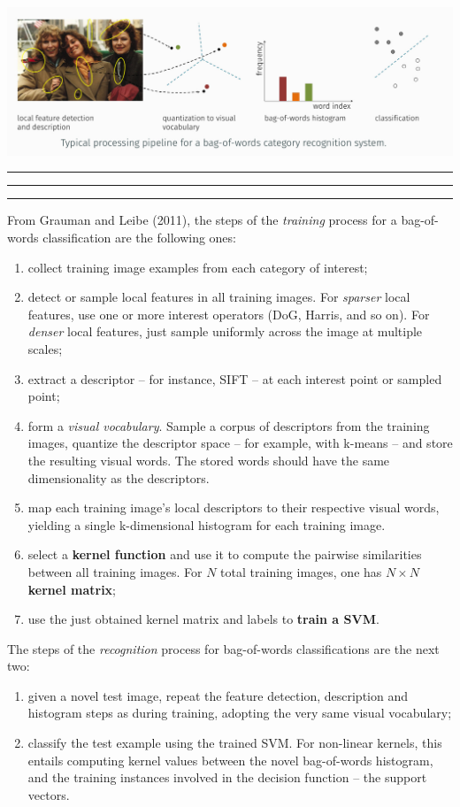 \documentclass[10pt]{report}
\begin{document}
\begin{center}
\includegraphics[width=.9\linewidth]{./pics/recog/bag-of-words-pipeline.jpg}
\end{center}

\vspace*{0.6cm}\hrule
\hrule
\hrule
\vspace*{0.4cm}
From Grauman and Leibe (2011), the steps of the \emph{training} process for a bag\--of\--words classification are the following ones:

\begin{enumerate}
\item collect training image examples from each category of interest;
\item detect or sample local features in all training images. For \emph{sparser} local features, use one or more interest operators (DoG, Harris, and so on). For \emph{denser} local features, just sample uniformly across the image at multiple scales;
\item extract a descriptor -- for instance, SIFT -- at each interest point or sampled point;
\item form a \emph{visual vocabulary}. Sample a corpus of descriptors from the training images, quantize the descriptor space -- for example, with k\--means -- and store the resulting visual words. The stored words should have the same dimensionality as the descriptors.
\item map each training image's local descriptors to their respective visual words, yielding a single k\--dimensional histogram for each training image.
\item select a \textbf{kernel function} and use it to compute the pairwise similarities between all training images. For \(N\) total training images, one has \(N \times N\) \textbf{kernel matrix};
\item use the just obtained kernel matrix and labels to \textbf{train a SVM}.
\end{enumerate}

The steps of the \emph{recognition} process for bag\--of\--words classifications are the next two:
\begin{enumerate}
\item given a novel test image, repeat the feature detection, description and histogram steps as during training, adopting the very same visual vocabulary;
\item classify the test example using the trained SVM. For non\--linear kernels, this entails computing kernel values between the novel bag\--of\--words histogram, and the training instances involved in the decision function -- the support vectors.
\end{enumerate}
\end{document}
